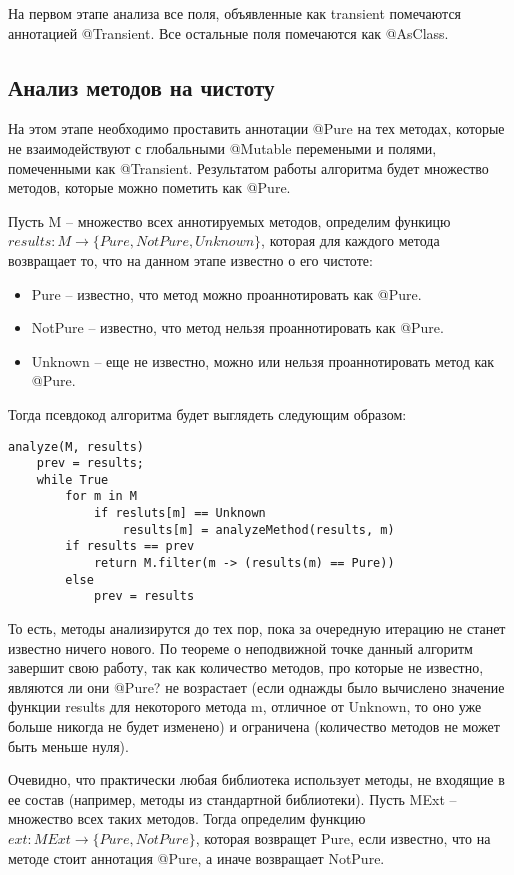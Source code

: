 На первом этапе анализа все поля, объявленные как transient помечаются аннотацией @Transient. Все остальные поля помечаются как @AsClass. 

\subsection{Анализ методов на чистоту}

На этом этапе необходимо проставить аннотации @Pure на тех методах, которые не взаимодействуют с глобальными @Mutable перемеными и полями, помеченными как @Transient. Результатом работы алгоритма будет множество методов, которые можно пометить как @Pure. 

Пусть M -- множество всех аннотируемых методов, определим функицю $results: M \rightarrow \{Pure, NotPure, Unknown\}$, которая для каждого метода возвращает то, что на данном этапе известно о его чистоте:
\begin{itemize}
\item Pure -- известно, что метод можно проаннотировать как @Pure.
\item NotPure -- известно, что метод нельзя проаннотировать как @Pure.
\item Unknown -- еще не известно, можно или нельзя проаннотировать метод как @Pure.
\end{itemize}

Тогда псевдокод алгоритма будет выглядеть следующим образом:

\begin{lstlisting}[caption=Анализ чистоты методов, label=code:purity]
analyze(M, results)
    prev = results;
    while True 
        for m in M 
            if resluts[m] == Unknown
                results[m] = analyzeMethod(results, m)
        if results == prev 
        	return M.filter(m -> (results(m) == Pure))        
        else 
            prev = results
\end{lstlisting}

То есть, методы анализирутся до тех пор, пока за очередную итерацию не станет известно ничего нового. По теореме о неподвижной точке данный алгоритм завершит свою работу, так как количество методов, про которые не известно, являются ли они @Pure? не возрастает (если однажды было вычислено значение функции results для некоторого метода m, отличное от Unknown, то оно уже больше никогда не будет изменено) и ограничена (количество методов не может быть меньше нуля). 

Очевидно, что практически любая библиотека использует методы, не входящие в ее состав (например, методы из стандартной библиотеки). Пусть MExt -- множество всех таких методов. Тогда определим функцию $ext: {MExt} \rightarrow \{Pure, NotPure\}$, которая возвращет Pure, если известно, что на методе стоит аннотация @Pure, а иначе возвращает NotPure. 

